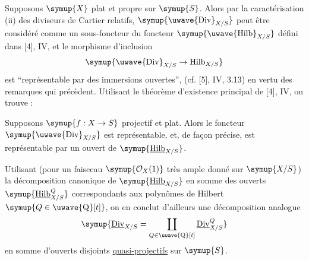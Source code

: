 Supposons $\symup{X}$ plat et propre sur $\symup{S}$. Alors par la caractérisation (ii) des
diviseurs de Cartier relatifs, $\symup{\text{\uwave{Div}}_{X/S}}$ peut être considéré
comme un sous-foncteur du foncteur $\symup{\text{\uwave{Hilb}}_{X/S}}$ défini dans
[4], IV, et le morphisme d'inclusion
\[
\symup{\text{\uwave{Div}}_{X/S}\to\operatorname{Hilb}_{X/S}}
\]
est ``représentable par des immersions ouvertes'', (cf. [5], IV, 3.13) en vertu
des remarques qui précèdent. Utilisant le théorème d'existence principal de
[4], IV, on trouve :

 Supposons $\symup{f:X\to S}$ projectif et plat.
Alors le foncteur $\symup{\text{\uwave{Div}}_{X/S}}$ est représentable, et, de façon
précise, est représentable par un ouvert de $\symup{\underline{\operatorname{Hilb}}_{X/S}}$.

Utilisant (pour un faisceau $\symup{\mathcal O_X(1)}$ très ample donné sur $\symup{X/S}$) la
décomposition canonique de $\symup{\underline{\operatorname{Hilb}}_{X/S}}$ en somme des ouverts
$\symup{\underline{\operatorname{Hilb}}^{Q}_{X/S}}$ correspondants aux polynômes de Hilbert
$\symup{Q\in\text{\uwave{Q}}[t]}$, on en conclut d'ailleurs une décomposition analogue
\[
\symup{\underline{\operatorname{Div}}_{X/S}=
\coprod\limits_{Q\in\text{\uwave{Q}}[t]}\underline{\operatorname{Div}}^{Q}_{X/S}}
\]
en somme d'ouverts disjoints \uline{quasi-projectifs} sur $\symup{S}$.

